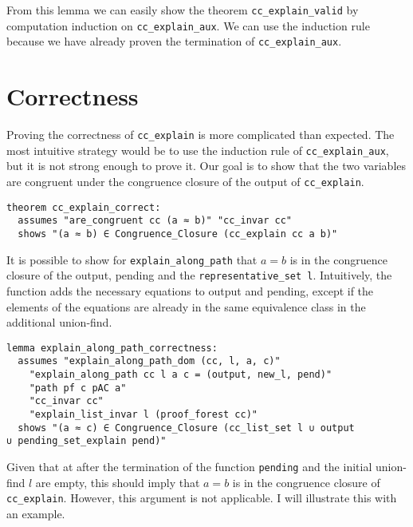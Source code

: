 From this lemma we can easily show the theorem \lstinline{cc_explain_valid} by computation induction on \lstinline{cc_explain_aux}. We can use the induction rule because we have already proven the termination of \lstinline{cc_explain_aux}.

\section{Correctness}

Proving the correctness of \lstinline{cc_explain} is more complicated than expected. The most intuitive strategy would be to use the induction rule of \lstinline{cc_explain_aux}, but it is not strong enough to prove it. Our goal is to show that the two variables are congruent under the congruence closure of the output of \lstinline{cc_explain}.

\begin{lstlisting}
theorem cc_explain_correct:
  assumes "are_congruent cc (a ≈ b)" "cc_invar cc"
  shows "(a ≈ b) ∈ Congruence_Closure (cc_explain cc a b)"
\end{lstlisting}

It is possible to show for \lstinline{explain_along_path} that $a = b$ is in the congruence closure of the output, pending and the \lstinline{representative_set l}. Intuitively, the function adds the necessary equations to output and pending, except if the elements of the equations are already in the same equivalence class in the additional union-find.

\begin{lstlisting}
lemma explain_along_path_correctness:
  assumes "explain_along_path_dom (cc, l, a, c)"
    "explain_along_path cc l a c = (output, new_l, pend)"
    "path pf c pAC a"
    "cc_invar cc"
    "explain_list_invar l (proof_forest cc)"
  shows "(a ≈ c) ∈ Congruence_Closure (cc_list_set l ∪ output
∪ pending_set_explain pend)"
\end{lstlisting}

Given that at after the termination of the function \lstinline{pending} and the initial union-find $l$ are empty, this should imply that $a = b$ is in the congruence closure of \lstinline{cc_explain}.
However, this argument is not applicable. I will illustrate this with an example.

